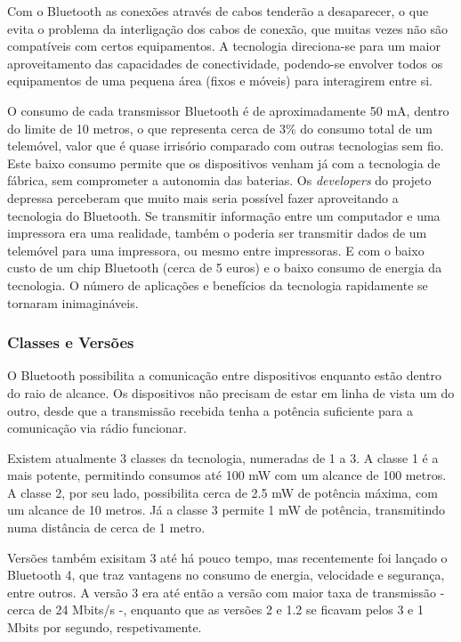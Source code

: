 \documentclass[conference]{IEEEtran}
\begin{document}
Com o Bluetooth as conexões através de cabos tenderão a desaparecer, o que evita o problema da interligação dos cabos de conexão, que muitas vezes não são compatíveis com certos equipamentos. 
A tecnologia direciona-se para um maior aproveitamento das capacidades de conectividade, podendo-se envolver todos os equipamentos de uma pequena área (fixos e móveis) para interagirem entre si. 

O consumo de cada transmissor Bluetooth é de aproximadamente 50 mA, dentro do limite de 10 metros, o que representa cerca de 3\% do consumo total de um telemóvel, valor que é quase irrisório comparado com outras tecnologias sem fio. 
Este baixo consumo permite que os dispositivos venham já com a tecnologia de fábrica, sem comprometer a autonomia das baterias. 
Os \textit{developers} do projeto depressa perceberam que muito mais seria possível fazer aproveitando a tecnologia do Bluetooth. 
Se transmitir informação entre um computador e uma impressora era uma realidade, também o poderia ser transmitir dados de um telemóvel para uma impressora, ou mesmo entre impressoras. 
E com o baixo custo de um chip Bluetooth (cerca de 5 euros) e o baixo consumo de energia da tecnologia. O número de aplicações e benefícios da tecnologia rapidamente se tornaram inimagináveis.

\subsubsection{Classes e Versões}

O Bluetooth possibilita a comunicação entre dispositivos enquanto estão dentro do raio de alcance. Os dispositivos não precisam de estar em linha de vista um do outro, desde que a transmissão recebida tenha a potência suficiente para a comunicação via rádio funcionar.

Existem atualmente 3 classes da tecnologia, numeradas de 1 a 3. A classe 1 é a mais potente, permitindo consumos até 100 mW com um alcance de 100 metros. A classe 2, por seu lado, possibilita cerca de 2.5 mW de potência máxima, com um alcance de 10 metros. Já a classe 3 permite 1 mW de potência, transmitindo numa distância de cerca de 1 metro.

Versões também exisitam 3 até há pouco tempo, mas recentemente foi lançado o Bluetooth 4, que traz vantagens no consumo de energia, velocidade e segurança, entre outros. A versão 3 era até então a versão com maior taxa de transmissão - cerca de 24 Mbits/s -, enquanto que as versões 2 e 1.2 se ficavam pelos 3 e 1 Mbits por segundo, respetivamente.
\end{document}
